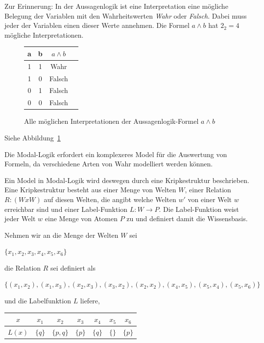 Zur Erinnerung: In der Aussagenlogik ist eine Interpretation eine mögliche Belegung der Variablen mit den Wahrheitswerten \emph{Wahr} oder \emph{Falsch}. Dabei muss jeder der Variablen einen dieser Werte annehmen. Die Formel $a \wedge b$ hat $2_2 = 4$ mögliche Interpretationen. 
\begin{figure}[ht]
	\begin{center}
		\begin{tabular}{cccc}
		\hline
		a & b & $a \wedge b$\\
		\hline
		1 & 1 & Wahr\\
		\hline
		1 & 0 & Falsch\\
		\hline
		0 & 1 & Falsch\\
		\hline
		0 & 0 & Falsch\\
		\hline
		\end{tabular}
		\caption{Alle möglichen Interpretationen der Aussagenlogik-Formel $a \wedge b$}
		\label{tab:AussagenlogikInterpretation}
	\end{center}
\end{figure}
Siehe Abbildung~\ref{tab:AussagenlogikInterpretation}
\cite{hunter1973metalogic}%

Die Modal-Logik erfordert ein komplexeres Model für die Auswertung von Formeln, da verschiedene Arten von Wahr modelliert werden können.\cite[S.308f]{huth2004logic}

Ein Model in Modal-Logik wird deswegen durch eine Kripkestruktur beschrieben. 
Eine Kripkestruktur besteht aus einer Menge von Welten $W$, einer Relation $R:(WxW)$ auf diesen Welten, die angibt welche Welten $w'$ von einer Welt $w$ erreichbar sind und einer Label-Funktion $L: W \rightarrow P$. 
Die Label-Funktion weist jeder Welt $w$ eine Menge von Atomen $P$ zu und definiert damit die Wissensbasis. 

Nehmen wir an die Menge der Welten $W$ sei 
\begin{center}
	$\{ x_1, x_2, x_3, x_4, x_5, x_6 \}$
\end{center}
 
die Relation $R$ sei definiert als 
\begin{center}
	$\{(x_1, x_2), (x_1, x_3), (x_2, x_3), (x_3, x_2), (x_2, x_2), (x_4, x_5), (x_5, x_4), (x_5, x_6)\}$ 
\end{center}

und die Labelfunktion $L$ liefere,
\begin{center}
	\begin{tabular}{c|cccccc}
		$x$ & $x_1$ & $x_2$ & $x_3$ & $x_4$ & $x_5$ & $x_6$\\
		\hline
		$L(x)$ & $\{q\}$ & $\{p,q\}$ & $\{p\}$ & $\{q\}$ & $\{\}$ & $\{p\}$
	\end{tabular}
\end{center}

